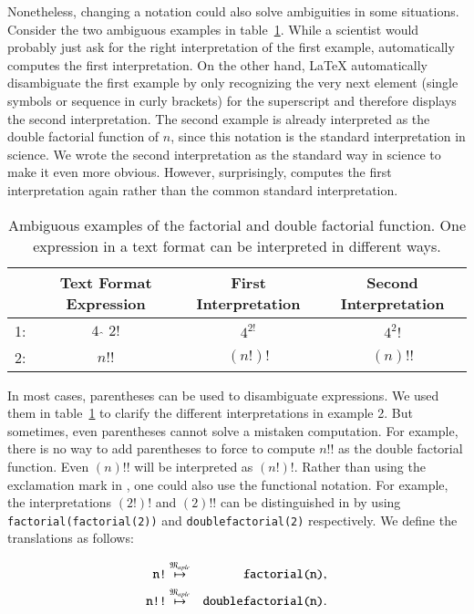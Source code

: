 Nonetheless, changing a notation could also solve ambiguities in some situations. Consider the two ambiguous examples in table~\ref{tab:amb_ex}. While a scientist would probably just ask for the right interpretation of the first example, \Maple{} automatically computes the first interpretation. On the other hand, \LaTeX{} automatically disambiguate the first example by only recognizing the very next element (single symbols or sequence in curly brackets) for the superscript and therefore displays the second interpretation. The second example is already interpreted as the double factorial function of $n$, since this notation is the standard interpretation in science. We wrote the second interpretation as the standard way in science to make it even more obvious. However, surprisingly, \Maple{} computes the first interpretation again rather than the common standard interpretation.
\begin{table}[ht]
\centering
\begin{tabular}{lccc}
	\hline
	& Text Format Expression & First Interpretation & Second Interpretation\\
	\hline
	1: & \rule{0pt}{0.9\normalbaselineskip} $4\ \hat{\ }\ 2!$ & $4^{2!}$ & $4^2!$ \\
	2: & $n!!$ & $(n!)!$ & $(n)!!$\\
	\hline
\end{tabular}
\caption{Ambiguous examples of the factorial and double factorial function. One expression in a text format can be interpreted in different ways.}
\label{tab:amb_ex}
\end{table}

In most cases, parentheses can be used to disambiguate expressions. We used them in table~\ref{tab:amb_ex} to clarify the different interpretations in example 2. But sometimes, even parentheses cannot solve a mistaken computation. For example, there is no way to add parentheses to force \Maple{} to compute $n!!$ as the double factorial function. Even $(n)!!$ will be interpreted as $(n!)!$. Rather than using the exclamation mark in \Maple, one could also use the functional notation. For example, the interpretations $(2!)!$ and $(2)!!$ can be distinguished in \Maple{} by using \verb|factorial(factorial(2))| and \verb|doublefactorial(2)| respectively. We define the translations as follows:

\begin{eqnarray*}
\verb|n!| &\overset{\langMaple}{\mapsto}& \verb|factorial(n)|,\\
\verb|n!!| &\overset{\langMaple}{\mapsto}& \verb|doublefactorial(n)|.
\end{eqnarray*}

